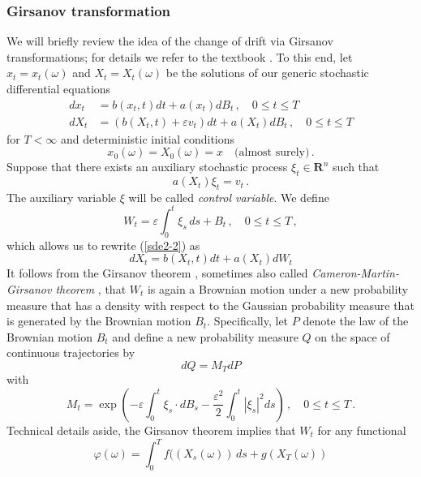 \documentclass[]{tMPH2e}
\newcommand{\redc}[1]{{\color{red} #1}}
\newcommand{\R}{{\mathbf R}}
\newcommand{\eps}{\varepsilon}
\newcommand{\wrt}{with respect to }
\begin{document}
\subsubsection*{Girsanov transformation}
We will briefly review the idea of the change of drift via Girsanov transformations; for details we refer to the textbook \cite{oksendal2003stochastic}. To this end, let $x_{t}=x_{t}(\omega)$ and $X_{t}=X_{t}(\omega)$ be the solutions of our generic stochastic differential equations
\begin{subequations}\label{sde2}
\begin{align}
dx_{t} & = b(x_{t},t)dt + a(x_{t})dB_{t}\,,\quad 0\le t\le T  \label{sde2-1}\\
dX_{t} & = (b(X_{t},t) + \eps v_{t})dt +a(X_{t})dB_{t}\,,\quad 0\le t\le T \label{sde2-2}
\end{align}
\end{subequations}
for $T<\infty$ and deterministic initial conditions
\[
x_{0}(\omega) = X_{0}(\omega) = x\quad\textrm{(almost surely)}\,.
\]
Suppose that there exists an auxiliary stochastic process \redc{ $\xi_{t}\in\R^{n}$} such that 
\begin{equation}\label{xi}
a(X_{t})\xi_{t} = v_{t}\,.
\end{equation}
The auxiliary variable $\xi$ will be called \emph{control variable}. We define  
\[
W_{t} = \eps\int_{0}^{t}\xi_{s}\,ds + B_{t}\,,\quad 0\le t\le T\,,
\]
which allows us to rewrite (\ref{sde2-2}) as
\begin{equation}\label{sde2-3}
dX_{t} = b(X_{t},t)dt +a(X_{t})dW_{t} 
\end{equation}
It follows from the Girsanov theorem \cite[Thm.~8.6.8]{oksendal2003stochastic}, sometimes also called \emph{Cameron-Martin-Girsanov theorem} \cite{stroock2006}, that $W_{t}$ is again a Brownian motion under a new probability measure that has a density \wrt the Gaussian probability measure that is generated by the Brownian motion $B_{t}$. Specifically, let $P$ denote the law of the Brownian motion $B_{t}$ and define a new probability measure $Q$ on the space of continuous trajectories by 
\[
dQ=M_{T}dP
\]
with 
\begin{equation}\label{likelihood}
M_{t} = \exp\left(-\eps\int_{0}^{t}\xi_{s}\cdot dB_{s} - \frac{\eps^{2}}{2}\int_{0}^{t}|\xi_{s}|^{2}ds\right)\,,\quad 0\le t\le T\,.
\end{equation}
Technical details aside, the Girsanov theorem implies that $W_{t}$  for any functional 
\[
\varphi(\omega)=\int_{0}^{T}f((X_{s}(\omega))\,ds + g(X_{T}(\omega))
\] 
\end{document}
